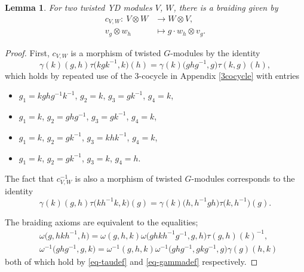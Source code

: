 \documentclass[pdftex]{sigma}
\numberwithin{equation}{section}
\newtheorem{Lemma}[Theorem]{Lemma}
\begin{document}
\begin{Lemma}
 For two twisted YD modules $V$, $W$, there is a braiding given by
 \begin{align*}
 c_{V,W}\colon\ V \otimes W &\to W \otimes V, \\
 v_g \otimes w_h &\mapsto g \cdot w_h \otimes v_g.
 \end{align*}
\end{Lemma}
\begin{proof}
First, $c_{V,W}$ is a morphism of twisted $G$-modules by the identity
\begin{equation}
\gamma(k)(g,h)\tau\big(kgk^{-1},k\big)(h)=\gamma(k)\big(ghg^{-1},g\big)\tau(k,g)(h),\label{eq:gamma-braid}
\end{equation}
which holds by repeated use of the $3$-cocycle in Appendix \ref{3cocycle} with entries
\begin{itemize}\itemsep=0pt
 \item [--] $g_1=kghg^{-1}k^{-1}$, $g_2=k$, $g_3=gk^{-1}$, $g_4=k$,
 \item [--] $g_1=k$, $g_2=ghg^{-1}$, $g_3=gk^{-1}$, $g_4=k$,
 \item [--] $g_1=k$, $g_2=gk^{-1}$, $g_3=khk^{-1}$, $g_4=k$,
 \item [--] $g_1=k$, $g_2=gk^{-1}$, $g_3=k$, $g_4=h$.
\end{itemize}
The fact that $c_{V,W}^{-1}$ is also a morphism of twisted $G$-modules corresponds to the identity
\begin{equation}\label{eq:gamma-braid2}
 \gamma(k)(g,h)\tau\big(kh^{-1}k,k\big)(g)=\gamma(k)\big(h,h^{-1}gh\big)\tau\big(k,h^{-1}\big)(g).
\end{equation}

The braiding axioms are equivalent to the equalities;
\begin{align*}
 &\omega\big(g,hkh^{-1},h\big) = \omega(g,h,k)\omega\big(ghkh^{-1}g^{-1},g,h\big) \tau(g,h)(k)^{-1}, \\
 &\omega^{-1} \big(ghg^{-1}, g,k\big) = \omega^{-1}(g,h,k)\omega^{-1}\big(ghg^{-1},gkg^{-1},g\big) \gamma(g)(h,k)
\end{align*}
 both of which hold by \eqref{eq-taudef} and \eqref{eq-gammadef} respectively.
\end{proof}
\end{document}
